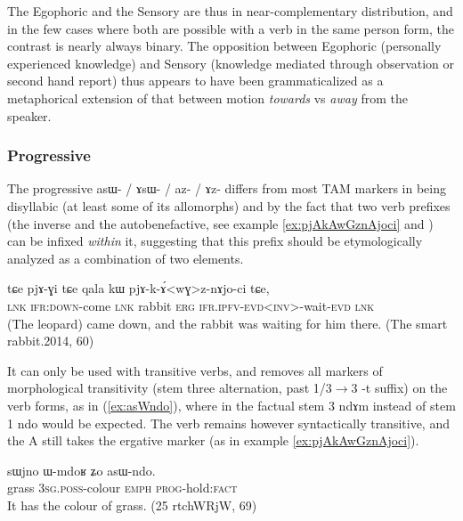 \documentclass[oldfontcommands,oneside,a4paper,11pt]{article}
\newcommand{\ipa}[1]{\mbox{\phon #1}} %
\begin{document}
The Egophoric and the Sensory are thus in near-complementary distribution, and in the few cases where both are possible with a verb in the same person form, the contrast is nearly always binary. The opposition between Egophoric (personally experienced knowledge) and  Sensory (knowledge mediated through observation or second hand report)  thus appears to have been grammaticalized as a metaphorical extension of that between motion \textit{towards} vs \textit{away} from the speaker.
 
\subsubsection{Progressive} \label{sec:prog}
The progressive \ipa{asɯ-} / \ipa{ɤsɯ-} / \ipa{az-} / \ipa{ɤz-} differs from most TAM markers in being disyllabic (at least some of its allomorphs) and by the fact that two verb prefixes (the inverse and the autobenefactive, see example \ref{ex:pjAkAwGznAjoci} and \citealt{jacques15spontaneous}) can be infixed \textit{within} it, suggesting that this prefix should be etymologically analyzed as a combination of two elements.

\begin{exe}
\ex \label{ex:pjAkAwGznAjoci}
\gll
\ipa{tɕe} 	\ipa{pjɤ-ɣi} 	\ipa{tɕe} 	\ipa{qala} 	\ipa{kɯ} 	\ipa{pjɤ-k-ɤ́<wɣ>z-nɤjo-ci} 	\ipa{tɕe,} \\
\textsc{lnk} \textsc{ifr:down}-come \textsc{lnk} rabbit \textsc{erg} \textsc{ifr.ipfv-evd<inv>}-wait-\textsc{evd} \textsc{lnk} \\
\glt (The leopard) came down, and the rabbit was waiting for him there. (The smart rabbit.2014, 60)
\end{exe}

It can only be used with transitive verbs, and removes all markers of morphological transitivity (stem three alternation, past 1/3$\rightarrow$3 \ipa{-t} suffix) on the verb forms, as in (\ref{ex:asWndo}), where in the factual stem 3 \ipa{ndɤm} instead of stem 1 \ipa{ndo} would be expected. The verb remains however syntactically transitive, and the A still takes the ergative marker (as in example \ref{ex:pjAkAwGznAjoci}).


\begin{exe}
\ex \label{ex:asWndo}
\gll
\ipa{sɯjno} 	\ipa{ɯ-mdoʁ} 	\ipa{ʑo} 	\ipa{asɯ-ndo.} \\
grass \textsc{3sg.poss}-colour \textsc{emph} \textsc{prog}-hold:\textsc{fact} \\
\glt It has the colour of grass. (25 rtchWRjW, 69)
\end{exe}
\end{document}
